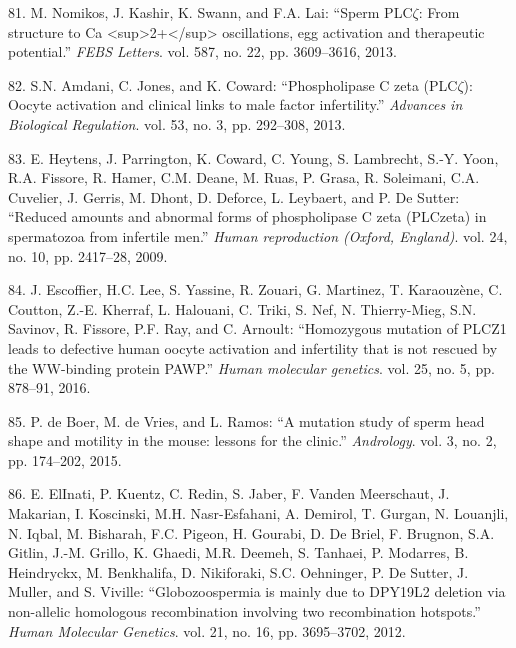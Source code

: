 \documentclass[12pt,twoside]{reedthesis}
\theoremstyle{definition}
\theoremstyle{definition}
\theoremstyle{remark}
\begin{document}
  \hypertarget{ref-Nomikos2013}{}
  81. M. Nomikos, J. Kashir, K. Swann, and F.A. Lai: ``Sperm PLC\(\zeta\):
  From structure to Ca
  \textless{}sup\textgreater{}2+\textless{}/sup\textgreater{}
  oscillations, egg activation and therapeutic potential.'' \emph{FEBS
  Letters}. vol. 587, no. 22, pp. 3609--3616, 2013.
  
  \hypertarget{ref-Amdani2013}{}
  82. S.N. Amdani, C. Jones, and K. Coward: ``Phospholipase C zeta
  (PLC\(\zeta\)): Oocyte activation and clinical links to male factor
  infertility.'' \emph{Advances in Biological Regulation}. vol. 53, no. 3,
  pp. 292--308, 2013.
  
  \hypertarget{ref-Heytens2009}{}
  83. E. Heytens, J. Parrington, K. Coward, C. Young, S. Lambrecht, S.-Y.
  Yoon, R.A. Fissore, R. Hamer, C.M. Deane, M. Ruas, P. Grasa, R.
  Soleimani, C.A. Cuvelier, J. Gerris, M. Dhont, D. Deforce, L. Leybaert,
  and P. De Sutter: ``Reduced amounts and abnormal forms of phospholipase
  C zeta (PLCzeta) in spermatozoa from infertile men.'' \emph{Human
  reproduction (Oxford, England)}. vol. 24, no. 10, pp. 2417--28, 2009.
  
  \hypertarget{ref-Escoffier2016}{}
  84. J. Escoffier, H.C. Lee, S. Yassine, R. Zouari, G. Martinez, T.
  Karaouzène, C. Coutton, Z.-E. Kherraf, L. Halouani, C. Triki, S. Nef, N.
  Thierry-Mieg, S.N. Savinov, R. Fissore, P.F. Ray, and C. Arnoult:
  ``Homozygous mutation of PLCZ1 leads to defective human oocyte
  activation and infertility that is not rescued by the WW-binding protein
  PAWP.'' \emph{Human molecular genetics}. vol. 25, no. 5, pp. 878--91,
  2016.
  
  \hypertarget{ref-DeBoer2015}{}
  85. P. de Boer, M. de Vries, and L. Ramos: ``A mutation study of sperm
  head shape and motility in the mouse: lessons for the clinic.''
  \emph{Andrology}. vol. 3, no. 2, pp. 174--202, 2015.
  
  \hypertarget{ref-ElInati2012}{}
  86. E. ElInati, P. Kuentz, C. Redin, S. Jaber, F. Vanden Meerschaut, J.
  Makarian, I. Koscinski, M.H. Nasr-Esfahani, A. Demirol, T. Gurgan, N.
  Louanjli, N. Iqbal, M. Bisharah, F.C. Pigeon, H. Gourabi, D. De Briel,
  F. Brugnon, S.A. Gitlin, J.-M. Grillo, K. Ghaedi, M.R. Deemeh, S.
  Tanhaei, P. Modarres, B. Heindryckx, M. Benkhalifa, D. Nikiforaki, S.C.
  Oehninger, P. De Sutter, J. Muller, and S. Viville: ``Globozoospermia is
  mainly due to DPY19L2 deletion via non-allelic homologous recombination
  involving two recombination hotspots.'' \emph{Human Molecular Genetics}.
  vol. 21, no. 16, pp. 3695--3702, 2012.
  
\end{document}
